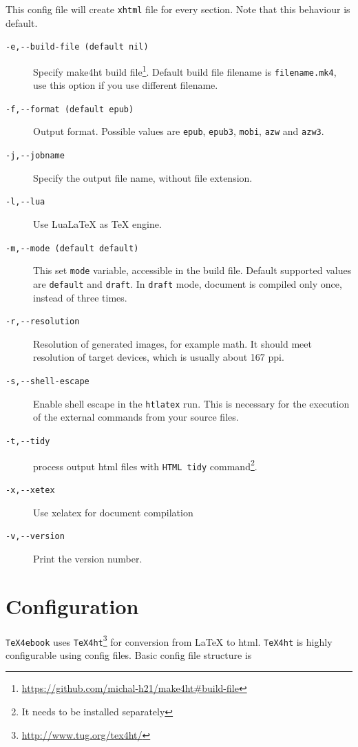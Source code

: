 This config file will create \texttt{xhtml} file for every section. Note
that this behaviour is default.

\begin{description}
\item[\texttt{-e,-\/-build-file\ (default\ nil)}]
Specify make4ht build file\footnote{\url{https://github.com/michal-h21/make4ht\#build-file}}.
Default build file filename is \texttt{filename.mk4}, use this option if
you use different filename.
\item[\texttt{-f,-\/-format\ (default\ epub)}]
Output format. Possible values are \texttt{epub}, \texttt{epub3},
\texttt{mobi}, \texttt{azw} and \texttt{azw3}.
\item[\texttt{-j,-\/-jobname}]
Specify the output file name, without file extension.
\item[\texttt{-l,-\/-lua}]
Use LuaLaTeX as TeX engine.
\item[\texttt{-m,-\/-mode\ (default\ default)}]
This set \texttt{mode} variable, accessible in the build file. Default
supported values are \texttt{default} and \texttt{draft}. In
\texttt{draft} mode, document is compiled only once, instead of three
times.
\item[\texttt{-r,-\/-resolution}]
Resolution of generated images, for example math. It should meet
resolution of target devices, which is usually about 167 ppi.
\item[\texttt{-s,-\/-shell-escape}]
Enable shell escape in the \texttt{htlatex} run. This is necessary for
the execution of the external commands from your source files.
\item[\texttt{-t,-\/-tidy}]
process output html files with \texttt{HTML\ tidy} command\footnote{It
  needs to be installed separately}.
\item[\texttt{-x,-\/-xetex}]
Use xelatex for document compilation
\item[\texttt{-v,-\/-version}]
Print the version number.
\end{description}

\hypertarget{configuration}{%
\section{Configuration}\label{configuration}}

\texttt{TeX4ebook} uses \texttt{TeX4ht}\footnote{\url{http://www.tug.org/tex4ht/}}
for conversion from LaTeX to html. \texttt{TeX4ht} is highly
configurable using config files. Basic config file structure is

